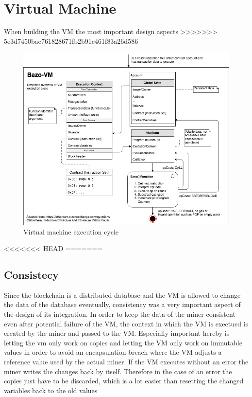 \section{Virtual Machine}
When building the VM the most important design aspects
>>>>>>> 5e3d7450bae761828671fb2b91c461f83a26d586

\pagebreak

\begin{figure}[H]
	\begin{center}
	\includegraphics[width=\textwidth]{./images/execution-cycle}
	\caption{Virtual machine execution cycle}
	\label{vmexecutioncycle}
	\end{center}
\end{figure}

<<<<<<< HEAD
=======
\subsection{Consistecy}
Since the blockchain is a distributed database and the VM is allowed to change the data of the database eventually, consistency was a very important aspect of the design of its integration. In order to keep the data of the miner consistent even after potential failure of the VM, the context in which the VM is exectued is created by the miner and passed to the VM. Especially important hereby is letting the vm only work on copies and letting the VM only work on immutable values in order to avoid an encapsulation breach where the VM adjusts a reference value used by the actual miner. If the VM executes without an error the miner writes the changes back by itself. Therefore in the case of an error the copies just have to be discarded, which is a lot easier than resetting the changed variables back to the old values

